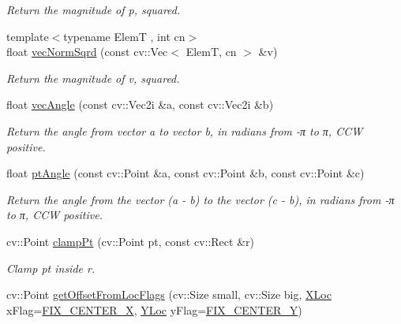 \begin{DoxyCompactItemize}
\begin{DoxyCompactList}\small\item\em Return the magnitude of {\ttfamily p}, squared. \end{DoxyCompactList}\item 
{\footnotesize template$<$typename Elem\-T , int cn$>$ }\\float \hyperlink{namespacecvutils_1_1geom_ab5fea22f416b23e22a2391595b06a91c}{vec\-Norm\-Sqrd} (const cv\-::\-Vec$<$ Elem\-T, cn $>$ \&v)
\begin{DoxyCompactList}\small\item\em Return the magnitude of {\ttfamily v}, squared. \end{DoxyCompactList}\item 
float \hyperlink{namespacecvutils_1_1geom_addc2fddd5dde5606004afeda56a54f14}{vec\-Angle} (const cv\-::\-Vec2i \&a, const cv\-::\-Vec2i \&b)
\begin{DoxyCompactList}\small\item\em Return the angle from vector {\ttfamily a} to vector {\ttfamily b}, in radians from -\/π to π, C\-C\-W positive. \end{DoxyCompactList}\item 
float \hyperlink{namespacecvutils_1_1geom_a9107a51cad42bd43fb4792f0a0561e58}{pt\-Angle} (const cv\-::\-Point \&a, const cv\-::\-Point \&b, const cv\-::\-Point \&c)
\begin{DoxyCompactList}\small\item\em Return the angle from the vector {\ttfamily (a -\/ b)} to the vector {\ttfamily (c -\/ b)}, in radians from -\/π to π, C\-C\-W positive. \end{DoxyCompactList}\item 
cv\-::\-Point \hyperlink{namespacecvutils_1_1geom_ab040ea663623480d3fa5fa29b63eefe2}{clamp\-Pt} (cv\-::\-Point pt, const cv\-::\-Rect \&r)
\begin{DoxyCompactList}\small\item\em Clamp {\ttfamily pt} inside {\ttfamily r}. \end{DoxyCompactList}\item 
cv\-::\-Point \hyperlink{namespacecvutils_1_1geom_a1da30c1609f24123ac40bc9aaa6672d3}{get\-Offset\-From\-Loc\-Flags} (cv\-::\-Size small, cv\-::\-Size big, \hyperlink{namespacecvutils_a955c1d8733f727414da8a357b938ced7}{X\-Loc} x\-Flag=\hyperlink{namespacecvutils_a955c1d8733f727414da8a357b938ced7a6a9a0a917be940c0641d145580dcf0f7}{F\-I\-X\-\_\-\-C\-E\-N\-T\-E\-R\-\_\-\-X}, \hyperlink{namespacecvutils_a0a32f5be1c20397001a2cdc59bacec81}{Y\-Loc} y\-Flag=\hyperlink{namespacecvutils_a0a32f5be1c20397001a2cdc59bacec81ad6382055c3ad3cb882f8f123e3b64f38}{F\-I\-X\-\_\-\-C\-E\-N\-T\-E\-R\-\_\-\-Y})

\end{DoxyCompactItemize}

